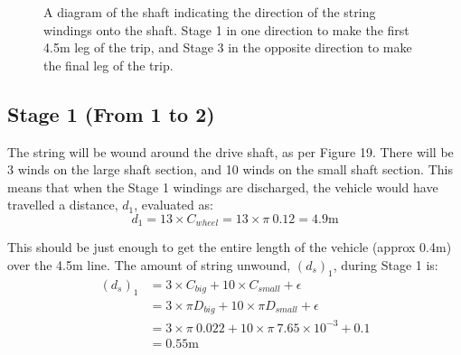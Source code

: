 \documentclass[a4paper]{article}
\begin{document}
\begin{figure}[h]
\begin{minipage}{0.45\textwidth}
		\caption{A diagram of the shaft indicating the direction of the string windings onto the shaft. Stage 1 in one direction to make the first 4.5m leg of the trip, and Stage 3 in the opposite direction to make the final leg of the trip.}
	\end{minipage}
\end{figure}

\subsection{Stage 1 (From 1 to 2)}
The string will be wound around the drive shaft, as per Figure 19. There will be 3 winds on the large shaft section, and 10 winds on the small shaft section. This means that when the Stage 1 windings are discharged, the vehicle would have travelled a distance, $d_1$, evaluated as:
\begin{equation}
	d_1 = 13 \times C_{wheel} = 13 \times \pi \ 0.12 = 4.9\si{\meter}
\end{equation}

This should be just enough to get the entire length of the vehicle (approx 0.4m) over the 4.5m line. The amount of string unwound, $(d_{s})_1$, during Stage 1 is:
\begin{align}
	(d_{s})_1 	&= 3 \times C_{big} + 10 \times C_{small} + \epsilon \nonumber \\
				&= 3 \times \pi D_{big}  + 10 \times \pi D_{small} + \epsilon \nonumber \\
				&= 3 \times \pi \ 0.022  + 10 \times \pi \ 7.65 \times 10^{-3} + 0.1 \nonumber \\
				&= 0.55\si{\meter}
\end{align} 
\end{document}

